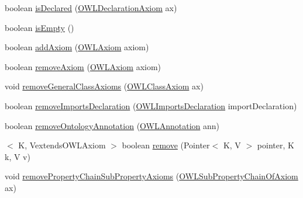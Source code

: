 \begin{DoxyCompactItemize}
\item 
boolean \hyperlink{interfaceuk_1_1ac_1_1manchester_1_1cs_1_1owl_1_1owlapi_1_1_internals_a21440e90ce1f150d30b17d9e5d5fdb38}{is\-Declared} (\hyperlink{interfaceorg_1_1semanticweb_1_1owlapi_1_1model_1_1_o_w_l_declaration_axiom}{O\-W\-L\-Declaration\-Axiom} ax)
\item 
boolean \hyperlink{interfaceuk_1_1ac_1_1manchester_1_1cs_1_1owl_1_1owlapi_1_1_internals_ae4ba5e7c46805f61648956a1d7d4cd58}{is\-Empty} ()
\item 
boolean \hyperlink{interfaceuk_1_1ac_1_1manchester_1_1cs_1_1owl_1_1owlapi_1_1_internals_a25dcfda0496e1cb80675c7ead6066be9}{add\-Axiom} (\hyperlink{interfaceorg_1_1semanticweb_1_1owlapi_1_1model_1_1_o_w_l_axiom}{O\-W\-L\-Axiom} axiom)
\item 
boolean \hyperlink{interfaceuk_1_1ac_1_1manchester_1_1cs_1_1owl_1_1owlapi_1_1_internals_a9c9d3298314cb796cb331d2535541a85}{remove\-Axiom} (\hyperlink{interfaceorg_1_1semanticweb_1_1owlapi_1_1model_1_1_o_w_l_axiom}{O\-W\-L\-Axiom} axiom)
\item 
void \hyperlink{interfaceuk_1_1ac_1_1manchester_1_1cs_1_1owl_1_1owlapi_1_1_internals_a0939222ed276901544ea70844f387f2d}{remove\-General\-Class\-Axioms} (\hyperlink{interfaceorg_1_1semanticweb_1_1owlapi_1_1model_1_1_o_w_l_class_axiom}{O\-W\-L\-Class\-Axiom} ax)
\item 
boolean \hyperlink{interfaceuk_1_1ac_1_1manchester_1_1cs_1_1owl_1_1owlapi_1_1_internals_a2f738d037cb14f6b71f45fa68cb05928}{remove\-Imports\-Declaration} (\hyperlink{interfaceorg_1_1semanticweb_1_1owlapi_1_1model_1_1_o_w_l_imports_declaration}{O\-W\-L\-Imports\-Declaration} import\-Declaration)
\item 
boolean \hyperlink{interfaceuk_1_1ac_1_1manchester_1_1cs_1_1owl_1_1owlapi_1_1_internals_aa38f5aa5b54ec365a7d9a3a6654c54e0}{remove\-Ontology\-Annotation} (\hyperlink{interfaceorg_1_1semanticweb_1_1owlapi_1_1model_1_1_o_w_l_annotation}{O\-W\-L\-Annotation} ann)
\item 
$<$ K, Vextends\-O\-W\-L\-Axiom $>$ boolean \hyperlink{interfaceuk_1_1ac_1_1manchester_1_1cs_1_1owl_1_1owlapi_1_1_internals_ada90e20392a6f718507a3bd7a600e3c4}{remove} (Pointer$<$ K, V $>$ pointer, K k, V v)
\item 
void \hyperlink{interfaceuk_1_1ac_1_1manchester_1_1cs_1_1owl_1_1owlapi_1_1_internals_a6a6223140a53c1cfbe71e6a076e15018}{remove\-Property\-Chain\-Sub\-Property\-Axioms} (\hyperlink{interfaceorg_1_1semanticweb_1_1owlapi_1_1model_1_1_o_w_l_sub_property_chain_of_axiom}{O\-W\-L\-Sub\-Property\-Chain\-Of\-Axiom} ax)
\end{DoxyCompactItemize}


